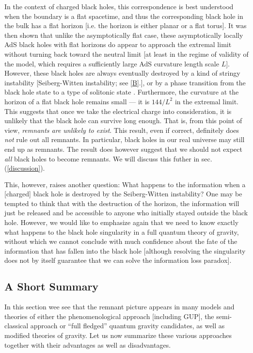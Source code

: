 \documentclass[12pt]{article}
\newcommand{\2}{$^2$}
\newcommand{\3}{$^3$}
\newcommand{\4}{$_4$}
\newcommand{\5}{$_5$}
\begin{document}
In the context of charged black holes, this correspondence is best understood when the boundary is a flat spacetime, and thus the corresponding black hole in the bulk has a flat horizon [i.e. the horizon is either planar or a flat torus]. It was then shown that unlike the asymptotically flat case, these asymptotically locally AdS black holes with flat horizons do appear to approach the extremal limit without turning back toward the neutral limit [at least in the regime of validity of the model, which requires a sufficiently large AdS curvature length scale $L$]. However, these black holes are always eventually destroyed by a kind of stringy instability [Seiberg-Witten instability; see \ref{B}.], or by a phase transition from the black hole state to a type of solitonic state \cite{kn:surya, kn:hormy}. Furthermore, the curvature at the horizon of a flat black hole remains small --- it is $144/L^2$ in the extremal limit. 
This suggests that once we take the electrical charge into consideration, it is unlikely that the black hole can survive long enough. That is, from this point of view, \emph{remnants are unlikely to exist}. This result, even if correct, definitely does \emph{not} rule out all remnants. In particular, black holes in our real universe may still end up as remnants. The result does however suggest that we should not expect \emph{all} black holes to become remnants. We will discuss this futher in sec.(\ref{discussion}). 

This, however, raises another question: What happens to the information when a [charged] black hole is destroyed by the Seiberg-Witten instability? One may be tempted to think that with the destruction of the horizon, the information will just be released and be accessible to anyone who initially stayed outside the black hole. However, we would like to emphasize again that we need to know exactly what happens to the black hole singularity in a full quantum theory of gravity, without which we cannot conclude with much confidence about the fate of the information that has fallen into the black hole [although resolving the singularity does not by itself guarantee that we can solve the information loss paradox]. 



\subsection{A Short Summary}

In this section wee see that the remnant picture appears in many models and theories of either the phenomenological approach [including GUP], the semi-classical approach or ``full fledged'' quantum gravity candidates, as well as modified theories of gravity.  Let us now summarize these various approaches together with their advantages as well as disadvantages. 
\end{document}
